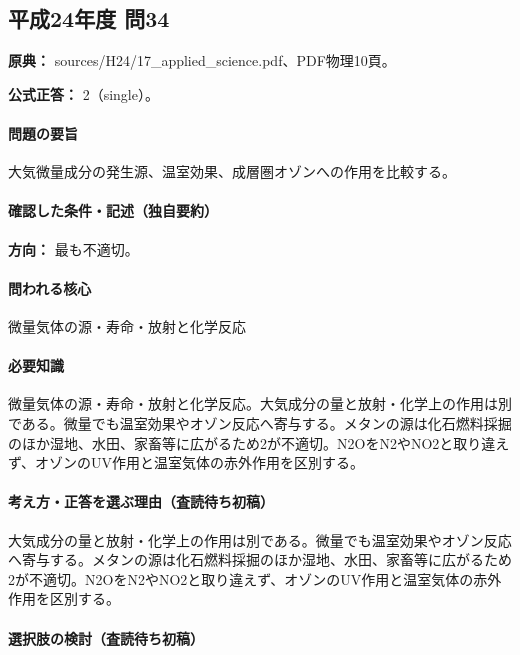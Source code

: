 \subsection{平成24年度 問34}
\label{q:h24-reg-applied-34}

\noindent\textbf{原典：} sources/H24/17\_applied\_science.pdf、PDF物理10頁。

\textbf{公式正答：} 2（single）。

\paragraph{問題の要旨} 大気微量成分の発生源、温室効果、成層圏オゾンへの作用を比較する。

\paragraph{確認した条件・記述（独自要約）}\mbox{}\par

\noindent\textbf{方向：} 最も不適切。\par

\paragraph{問われる核心} 微量気体の源・寿命・放射と化学反応

\paragraph{必要知識} 微量気体の源・寿命・放射と化学反応。大気成分の量と放射・化学上の作用は別である。微量でも温室効果やオゾン反応へ寄与する。メタンの源は化石燃料採掘のほか湿地、水田、家畜等に広がるため2が不適切。N2OをN2やNO2と取り違えず、オゾンのUV作用と温室気体の赤外作用を区別する。

\paragraph{考え方・正答を選ぶ理由（査読待ち初稿）} 大気成分の量と放射・化学上の作用は別である。微量でも温室効果やオゾン反応へ寄与する。メタンの源は化石燃料採掘のほか湿地、水田、家畜等に広がるため2が不適切。N2OをN2やNO2と取り違えず、オゾンのUV作用と温室気体の赤外作用を区別する。

\paragraph{選択肢の検討（査読待ち初稿）}\mbox{}\par

